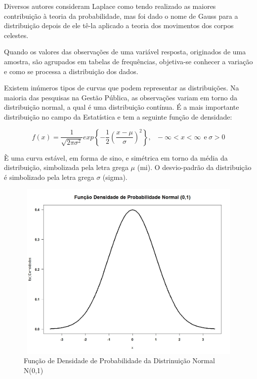 
\vskip0.3cm 
Diversos autores consideram Laplace como tendo realizado as maiores contribuição à teoria da probabilidade, mas foi dado o nome de Gauss para a distribuição depois de ele tê-la aplicado a teoria dos movimentos dos corpos celestes.\vskip0.3cm 


\inic Quando os valores das observações de uma variável resposta, originados de uma amostra, são agrupados em tabelas de frequências, objetiva-se conhecer a variação e como se processa a distribuição dos dados.\vskip0.3cm 

\inic Existem inúmeros tipos de curvas que podem representar as distribuições. Na maioria das pesquisas na Gestão Pública, as observações variam em torno da distribuição normal, a qual é uma distribuição contínua. É a mais importante distribuição no campo da Estatística e tem a seguinte função de densidade:\vskip0.3cm 


\begin{equation}
f\left(x\right) = \frac{1}{\sqrt{2\pi \sigma^2}}exp \left\{-\frac{1}{2}\left(\frac{x-\mu}{\sigma}\right)^2 \right\},~~~-\infty<x<\infty~~\text{e}~\sigma>0
 \end{equation} 

È uma curva estável, em forma de sino, e simétrica em torno da média da distribuição, simbolizada pela letra grega $\mu$ (mi). O desvio-padrão da distribuição é simbolizado pela letra grega $\sigma$ (sigma).\vskip0.3cm 


\begin{figure}
    \centering
\includegraphics[scale=0.50,height=250pt,width=13cm]{figures/densidade1.jpeg}
    \caption{Função de Densidade de Probabilidade da Distrinuição Normal N(0,1)}
    \label{fig:my_label70}
\end{figure}








